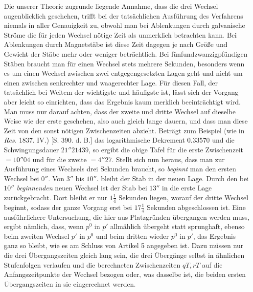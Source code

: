 Die unserer Theorie zugrunde liegende Annahme, dass die drei Wechsel augenblicklich geschehen, trifft bei der tatsächlichen Ausführung des Verfahrens niemals in aller Genauigkeit zu, obwohl man bei Ablenkungen durch galvanische Ströme die für jeden Wechsel nötige Zeit als unmerklich betrachten kann. Bei Ablenkungen durch Magnetstäbe ist diese Zeit dagegen je nach Größe und Gewicht der Stäbe mehr oder weniger beträchtlich. Bei fünfundzwanzigpfündigen Stäben braucht man für einen Wechsel stets mehrere Sekunden, besonders wenn es um einen Wechsel zwischen zwei entgegengesetzten Lagen geht und nicht um einen zwischen senkrechter und waagerechter Lage. Für diesen Fall, der tatsächlich bei Weitem der wichtigste und häufigste ist, lässt sich der Vorgang aber leicht so einrichten, dass das Ergebnis kaum merklich beeinträchtigt wird. Man muss nur darauf achten, dass der zweite und dritte Wechsel auf dieselbe Weise wie der erste geschehen, also auch gleich lange dauern, und dass man diese Zeit von den sonst nötigen Zwischenzeiten abzieht. Beträgt zum Beispiel (wie in \textit{Res.} 1837. IV.) [S. 390. d. B.] das logarithmische Dekrement 0.33570 und die Schwingungsdauer $21''21439$, so ergibt die obige Tafel für die erste Zwischenzeit $=10''04$ und für die zweite $=4''27$. Stellt sich nun heraus, dass man zur Ausführung eines Wechsels drei Sekunden braucht, so \textit{beginnt} man den ersten Wechsel bei $0''$. Von $3''$ bis $10''$. bleibt der Stab in der neuen Lage. Durch den bei $10''$ \textit{beginnenden} neuen Wechsel ist der Stab bei $13''$ in die erste Lage zurückgebracht. Dort bleibt er nur $1\tfrac{1}{4}$ Sekunden liegen, worauf der dritte Wechsel beginnt, sodass der ganze Vorgang erst bei $17\tfrac{1}{4}$ Sekunden abgeschlossen ist. Eine ausführlichere Untersuchung, die hier aus Platzgründen übergangen werden muss, ergibt nämlich, dass, wenn $p^0$ in $p'$ allmählich übergeht statt sprunghaft, ebenso beim zweiten Wechsel $p'$ in $p^0$ und beim dritten wieder $p^0$ in $p'$, das Ergebnis ganz so bleibt, wie es am Schluss von Artikel 5 angegeben ist. Dazu müssen nur die drei Übergangszeiten gleich lang sein, die drei Übergänge selbst in ähnlichen Stufenfolgen verlaufen und die berechneten Zwischenzeiten $qT,rT$ auf die Anfangszeitpunkte der Wechsel bezogen oder, was dasselbe ist, die beiden ersten Übergangszeiten in sie eingerechnet werden.


